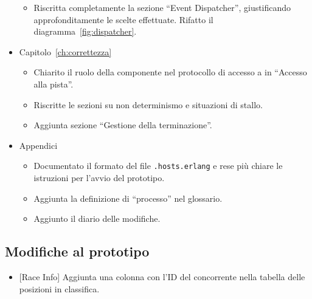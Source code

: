 \begin{itemize}
\begin{itemize}
	\item Riscritta completamente la sezione ``Event Dispatcher'', giustificando approfonditamente le scelte effettuate. Rifatto il diagramma~\ref{fig:dispatcher}.
	\end{itemize}
\item Capitolo~\ref{ch:correttezza}
	\begin{itemize}
	\item Chiarito il ruolo della componente \sched{} nel protocollo di accesso a \track{} in ``Accesso alla pista''.
	\item Riscritte le sezioni su non determinismo e situazioni di stallo.
	\item Aggiunta sezione ``Gestione della terminazione''.
	\end{itemize}
\item Appendici
	\begin{itemize}
	\item Documentato il formato del file \texttt{.hosts.erlang} e rese più chiare le istruzioni per l'avvio del prototipo.
	\item Aggiunta la definizione di ``processo'' nel glossario.
	\item Aggiunto il diario delle modifiche.
	\end{itemize}
\end{itemize}

\subsection*{Modifiche al prototipo}
\begin{itemize}
\item{} [Race Info] Aggiunta una colonna con l'ID del concorrente nella tabella delle posizioni in classifica.
\end{itemize}
